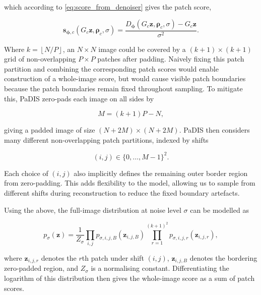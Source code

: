 which according to \eqref{eq:score_from_denoiser} gives the patch score,

\begin{equation}
\mathbf{s}_{\boldsymbol{\phi},c}(G_c\mathbf{z},\boldsymbol{\rho}_c,\sigma)
=
\frac{
D_{\boldsymbol{\phi}}(G_c\mathbf{z},\boldsymbol{\rho}_c,\sigma)
-
G_c\mathbf{z}
}{\sigma^2}.
\label{eq:padis_patch_score}
\end{equation}

Where $k=\left\lfloor N/P \right\rfloor$, an $N\times N$ image could be covered by a $(k+1)\times(k+1)$ grid of non-overlapping $P\times P$ patches after padding. Naively fixing this patch partition and combining the corresponding patch scores would enable construction of a whole-image score, but would cause visible patch boundaries because the patch boundaries remain fixed throughout sampling. To mitigate this, PaDIS zero-pads each image on all sides by

\begin{equation}
M=(k+1)P-N,
\label{eq:padis_padding}
\end{equation}

giving a padded image of size $(N+2M)\times(N+2M)$. PaDIS then considers many different non-overlapping patch partitions, indexed by shifts

\begin{equation}
(i,j)\in\{0,\dots,M-1\}^2.
\label{eq:padis_shifts}
\end{equation}

Each choice of $(i,j)$ also implicitly defines the remaining outer border region from zero-padding. This adds flexibility to the model, allowing us to sample from different shifts during reconstruction to reduce the fixed boundary artefacts.

Using the above, the full-image distribution at noise level $\sigma$ can be modelled as

\begin{equation}
p_\sigma(\mathbf{z})
=
\frac{1}{Z_\sigma}
\prod_{i,j}
p_{\sigma,i,j,B}(\mathbf{z}_{i,j,B})
\prod_{r=1}^{(k+1)^2}
p_{\sigma,i,j,r}(\mathbf{z}_{i,j,r}),
\label{eq:padis_full_image_distribution}
\end{equation}

where $\mathbf{z}_{i,j,r}$ denotes the $r$th patch under shift $(i,j)$, $\mathbf{z}_{i,j,B}$ denotes the bordering zero-padded region, and $Z_\sigma$ is a normalising constant. Differentiating the logarithm of this distribution then gives the whole-image score as a sum of patch scores.

